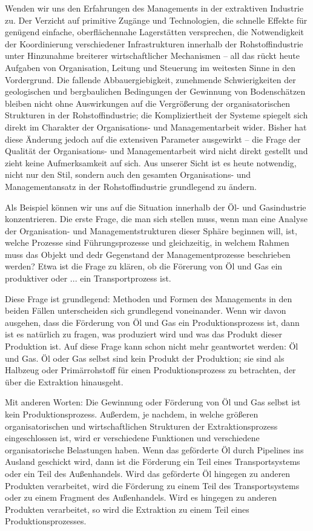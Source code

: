 \documentclass[11pt,a4paper]{article}
\begin{document}
Wenden wir uns den Erfahrungen des Managements in der extraktiven Industrie
zu.  Der Verzicht auf primitive Zugänge und Technologien, die schnelle Effekte
für genügend einfache, oberflächennahe Lagerstätten versprechen, die
Notwendigkeit der Koordinierung verschiedener Infrastrukturen innerhalb der
Rohstoffindustrie unter Hinzunahme breiterer wirtschaftlicher Mechanismen --
all das rückt heute Aufgaben von Organisation, Leitung und Steuerung im
weitesten Sinne in den Vordergrund. Die fallende Abbauergiebigkeit, zunehmende
Schwierigkeiten der geologischen und bergbaulichen Bedingungen der Gewinnung
von Bodenschätzen bleiben nicht ohne Auswirkungen auf die Vergrößerung der
organisatorischen Strukturen in der Rohstoffindustrie; die Kompliziertheit der
Systeme spiegelt sich direkt im Charakter der Organisations- und
Managementarbeit wider. Bisher hat diese Änderung jedoch auf die extensiven
Parameter ausgewirkt -- die Frage der Qualität der Organisations- und
Managementarbeit wird nicht direkt gestellt und zieht keine Aufmerksamkeit auf
sich.  Aus unserer Sicht ist es heute notwendig, nicht nur den Stil, sondern
auch den gesamten Organisations- und Managementansatz in der Rohstoffindustrie
grundlegend zu ändern.

Als Beispiel können wir uns auf die Situation innerhalb der Öl- und
Gasindustrie konzentrieren. Die erste Frage, die man sich stellen muss, wenn
man eine Analyse der Organisation- und Managementstrukturen dieser Sphäre
beginnen will, ist, welche Prozesse sind Führungsprozesse und gleichzeitig, in
welchem Rahmen muss das Objekt und dedr Gegenstand der Managementprozesse
beschrieben werden?  Etwa ist die Frage zu klären, ob die Förerung von Öl und
Gas ein produktiver oder ... ein Transportprozess ist.

Diese Frage ist grundlegend: Methoden und Formen des Managements in den beiden
Fällen unterscheiden sich grundlegend voneinander. Wenn wir davon ausgehen,
dass die Förderung von Öl und Gas ein Produktionsprozess ist, dann ist es
natürlich zu fragen, was produziert wird und was das Produkt dieser Produktion
ist. Auf diese Frage kann schon nicht mehr geantwortet werden: Öl und Gas. Öl
oder Gas selbst sind kein Produkt der Produktion; sie sind als Halbzeug oder
Primärrohstoff für einen Produktionsprozess zu betrachten, der über die
Extraktion hinausgeht.

Mit anderen Worten: Die Gewinnung oder Förderung von Öl und Gas selbst ist
kein Produktionsprozess. Außerdem, je nachdem, in welche größeren
organisatorischen und wirtschaftlichen Strukturen der Extraktionsprozess
eingeschlossen ist, wird er verschiedene Funktionen und verschiedene
organisatorische Belastungen haben. Wenn das geförderte Öl durch Pipelines ins
Ausland geschickt wird, dann ist die Förderung ein Teil eines Transportsystems
oder ein Teil des Außenhandels. Wird das geförderte Öl hingegen zu anderen
Produkten verarbeitet, wird die Förderung zu einem Teil des Transportsystems
oder zu einem Fragment des Außenhandels.  Wird es hingegen zu anderen
Produkten verarbeitet, so wird die Extraktion zu einem Teil eines
Produktionsprozesses.
\end{document}
